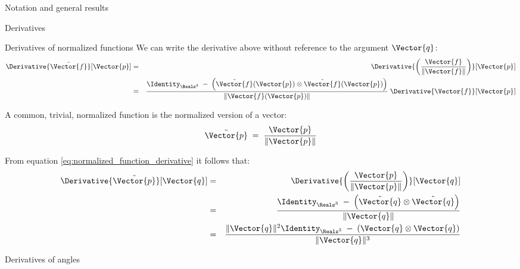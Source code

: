 \begin{plSection}{Notation and general results}
\begin{plSection}{Derivatives}
\begin{plSection}{Derivatives of normalized functions}
We can write the derivative above without reference to the argument $\Vector{q}$:
\begin{eqnarray}
\label{eq:normalized_function_derivative}
\Derivative{\tilde{\Vector{f}}}[\Vector{p}]
& = &
\Derivative{\left({\Vector{f} \over {\| \Vector{f} \|}}\right)}[\Vector{p}]  \\
& = &
{{\Identity_{\Reals^3} \;- \;\left( \tilde{\Vector{f}}(\Vector{p}) \otimes \tilde{\Vector{f}}(\Vector{p}) \right) }
\over {\| \Vector{f}(\Vector{p}) \|} }
\;\Derivative{\Vector{f}}[\Vector{p}] \nonumber
\end{eqnarray}

A common, trivial, normalized function is the normalized version of
a vector:
\begin{equation}
\tilde{\Vector{p}} \;= \;{{\Vector{p}} \over {\| \Vector{p} \|}}
\end{equation}

From equation \cref{eq:normalized_function_derivative}
it follows that:
\begin{eqnarray}
\label{eq:normalized_vector_derivative}
\Derivative{\tilde{\Vector{p}}}[\Vector{q}]
& = &
\Derivative{\left({\Vector{p} \over {\| \Vector{p} \|}}\right)}[\Vector{q}]
\\
& = &
{{\Identity_{\Reals^3} \;- \;\left( \tilde{\Vector{q}} \otimes \tilde{\Vector{q}} \right) }
\over {\| \Vector{q} \|} }
\nonumber
\\
& = &
{{\| \Vector{q} \|^2 \Identity_{\Reals^3} \;- \;\left( \Vector{q} \otimes \Vector{q} \right) }
\over {\| \Vector{q} \|^3} }
\nonumber
\end{eqnarray}

\end{plSection}%
\begin{plSection}{Derivatives of angles}
\label{sec:derivatives-of-angles}


\end{plSection}
\end{plSection}
\end{plSection}
